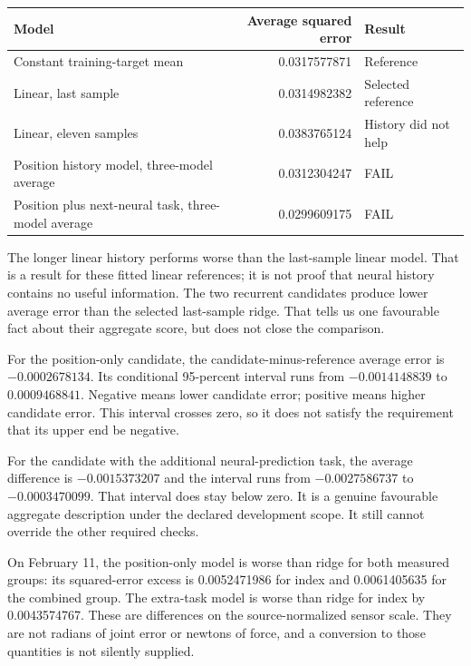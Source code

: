 \begin{center}
\begin{minipage}{\linewidth}
\centering\small
\begin{tabular}{p{}rl}
\toprule Model & Average squared error & Result\\\midrule
Constant training-target mean &0.0317577871&Reference\\
Linear, last sample &0.0314982382&Selected reference\\
Linear, eleven samples &0.0383765124&History did not help\\
Position history model, three-model average &0.0312304247&FAIL\\
Position plus next-neural task, three-model average &0.0299609175&FAIL\\\bottomrule
\end{tabular}
\end{minipage}
\end{center}

The longer linear history performs worse than the last-sample linear model.
That is a result for these fitted linear references; it is not proof that
neural history contains no useful information. The two recurrent candidates
produce lower average error than the selected last-sample ridge. That tells
us one favourable fact about their aggregate score, but does not close the
comparison.

For the position-only candidate, the candidate-minus-reference average error
is $-0.0002678134$. Its conditional 95-percent interval runs from
$-0.0014148839$ to $0.0009468841$. Negative means lower candidate error; positive
means higher candidate error. This interval crosses zero, so it does not satisfy
the requirement that its upper end be negative.

For the candidate with the additional neural-prediction task, the average
difference is $-0.0015373207$ and the interval runs from $-0.0027586737$ to
$-0.0003470099$. That interval does stay below zero. It is a genuine favourable
aggregate description under the declared development scope. It still cannot
override the other required checks.

On February 11, the position-only model is worse than ridge for both measured
groups: its squared-error excess is 0.0052471986 for index and 0.0061405635 for
the combined group. The extra-task model is worse than ridge for index by
0.0043574767. These are differences on the source-normalized sensor scale.
They are not radians of joint error or newtons of force, and a conversion to
those quantities is not silently supplied.

